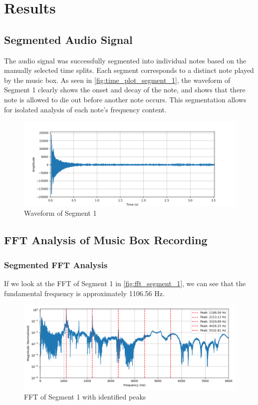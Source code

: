 \chapter{Results}

\section{Segmented Audio Signal}

The audio signal was successfully segmented into individual notes based on the manually selected time splits. Each segment corresponds to a distinct note played by the music box. As seen in \autoref{fig:time_plot_segment_1}, the waveform of Segment 1 clearly shows the onset and decay of the note, and shows that there note is allowed to die out before another note occurs. This segmentation allows for isolated analysis of each note's frequency content.

\begin{figure}[H]
    \centering
    \includegraphics[width=\textwidth]{data/time_plots/time_plot_segment_1.png}
    \caption{Waveform of Segment 1}
    \label{fig:time_plot_segment_1}
\end{figure}


\section{FFT Analysis of Music Box Recording}

\subsection{Segmented FFT Analysis}

If we look at the FFT of Segment 1 in \autoref{fig:fft_segment_1}, we can see that the fundamental frequency is approximately 1106.56 Hz. 

\begin{figure}[H]
    \centering
    \includegraphics[width=\textwidth]{data/fft_spectrums/fft_spectrum_segment_1.png}
    \caption{FFT of Segment 1 with identified peaks}
    \label{fig:fft_segment_1}
\end{figure}

